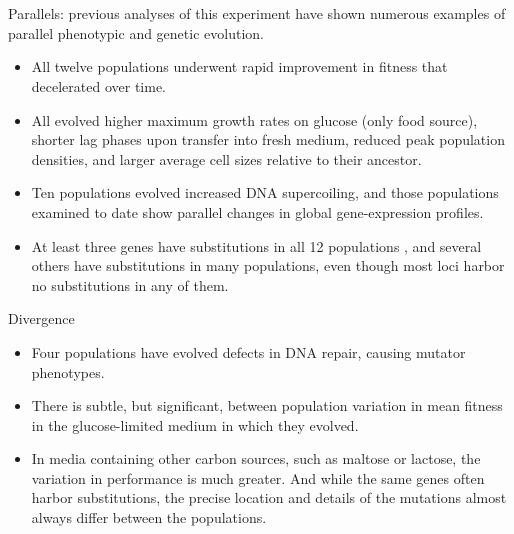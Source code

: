 \\
\\
\noindent
Parallels: previous analyses of this experiment have shown numerous examples of parallel phenotypic and genetic evolution. 
\begin{itemize}
\item All twelve populations underwent rapid improvement in fitness that decelerated over time. 
\item All evolved higher maximum growth rates on glucose (only food source), shorter lag phases upon transfer into fresh medium, reduced peak population densities, and larger average cell sizes relative to their ancestor. 
\item Ten populations evolved increased DNA supercoiling, and those populations examined to date show parallel changes in global gene-expression profiles. 
\item At least three genes have substitutions in all 12 populations , and several others have substitutions in many populations, even though most loci harbor no substitutions in any of them. 
\end{itemize}
\noindent
Divergence
\begin{itemize}
\item Four populations have evolved defects in DNA repair, causing mutator phenotypes. 
\item There is subtle, but significant, between population variation in mean fitness in the glucose-limited medium in which they evolved. 
\item In media containing other carbon sources, such as maltose or lactose, the variation in performance is much greater. And while the same genes often harbor substitutions, the precise location and details of the mutations almost always differ between the populations. 
\end{itemize}

